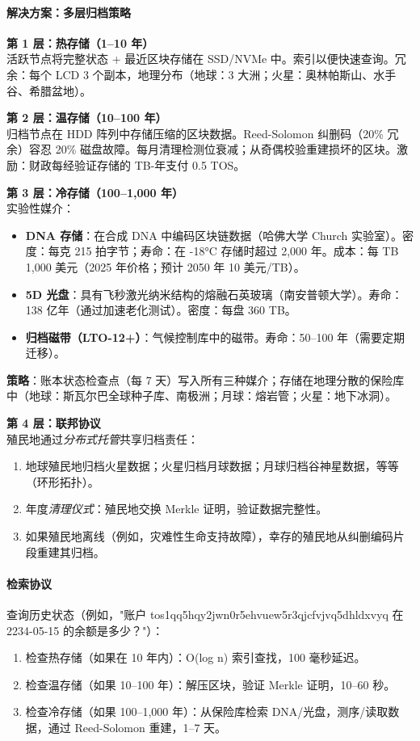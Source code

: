 \documentclass[11pt]{article}
\begin{document}
\paragraph{解决方案：多层归档策略}

\textbf{第 1 层：热存储（1--10 年）}\\
活跃节点将完整状态 + 最近区块存储在 SSD/NVMe 中。索引以便快速查询。冗余：每个 LCD 3 个副本，地理分布（地球：3 大洲；火星：奥林帕斯山、水手谷、希腊盆地）。

\textbf{第 2 层：温存储（10--100 年）}\\
归档节点在 HDD 阵列中存储压缩的区块数据。Reed-Solomon 纠删码（20\% 冗余）容忍 20\% 磁盘故障。每月清理检测位衰减；从奇偶校验重建损坏的区块。激励：财政每经验证存储的 TB-年支付 0.5 TOS。

\textbf{第 3 层：冷存储（100--1,000 年）}\\
实验性媒介：
\begin{itemize}[noitemsep]
  \item \textbf{DNA 存储}：在合成 DNA 中编码区块链数据（哈佛大学 Church 实验室）。密度：每克 215 拍字节；寿命：在 -18°C 存储时超过 2,000 年。成本：每 TB 1,000 美元（2025 年价格；预计 2050 年 10 美元/TB）。
  \item \textbf{5D 光盘}：具有飞秒激光纳米结构的熔融石英玻璃（南安普顿大学）。寿命：138 亿年（通过加速老化测试）。密度：每盘 360 TB。
  \item \textbf{归档磁带（LTO-12+）}：气候控制库中的磁带。寿命：50--100 年（需要定期迁移）。
\end{itemize}
\textbf{策略}：账本状态检查点（每 7 天）写入所有三种媒介；存储在地理分散的保险库中（地球：斯瓦尔巴全球种子库、南极洲；月球：熔岩管；火星：地下冰洞）。

\textbf{第 4 层：联邦协议}\\
殖民地通过\emph{分布式托管}共享归档责任：
\begin{enumerate}[noitemsep]
  \item 地球殖民地归档火星数据；火星归档月球数据；月球归档谷神星数据，等等（环形拓扑）。
  \item 年度\emph{清理仪式}：殖民地交换 Merkle 证明，验证数据完整性。
  \item 如果殖民地离线（例如，灾难性生命支持故障），幸存的殖民地从纠删编码片段重建其归档。
\end{enumerate}

\paragraph{检索协议}
查询历史状态（例如，"账户 tos1qq5hqy2jwn0r5ehvuew5r3qjcfvjvq5dhldxvyq 在 2234-05-15 的余额是多少？"）：
\begin{enumerate}[noitemsep]
  \item 检查热存储（如果在 10 年内）：O(log n) 索引查找，100 毫秒延迟。
  \item 检查温存储（如果 10--100 年）：解压区块，验证 Merkle 证明，10--60 秒。
  \item 检查冷存储（如果 100--1,000 年）：从保险库检索 DNA/光盘，测序/读取数据，通过 Reed-Solomon 重建，1--7 天。
\end{enumerate}
\end{document}
